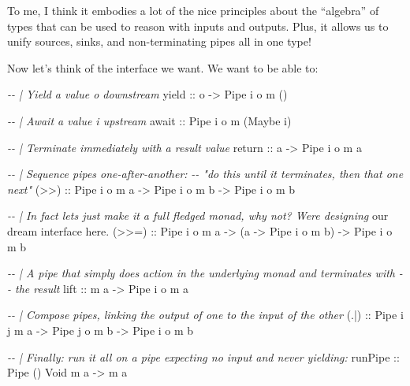 \documentclass[]{article}
\newenvironment{Shaded}{}{}
\newcommand{\CommentTok}[1]{\textcolor[rgb]{0.38,0.63,0.69}{\textit{#1}}}
\newcommand{\DataTypeTok}[1]{\textcolor[rgb]{0.56,0.13,0.00}{#1}}
\newcommand{\FunctionTok}[1]{\textcolor[rgb]{0.02,0.16,0.49}{#1}}
\newcommand{\NormalTok}[1]{#1}
\newcommand{\OperatorTok}[1]{\textcolor[rgb]{0.40,0.40,0.40}{#1}}
\newcommand{\OtherTok}[1]{\textcolor[rgb]{0.00,0.44,0.13}{#1}}
\begin{document}
To me, I think it embodies a lot of the nice principles about the ``algebra'' of
types that can be used to reason with inputs and outputs. Plus, it allows us to
unify sources, sinks, and non-terminating pipes all in one type!

Now let's think of the interface we want. We want to be able to:

\begin{Shaded}
\begin{Highlighting}[]
\CommentTok{{-}{-} | Yield a value \textasciigrave{}o\textasciigrave{} downstream}
\OtherTok{yield ::}\NormalTok{ o }\OtherTok{{-}>} \DataTypeTok{Pipe}\NormalTok{ i o m ()}

\CommentTok{{-}{-} | Await a value \textasciigrave{}i\textasciigrave{} upstream}
\OtherTok{await ::} \DataTypeTok{Pipe}\NormalTok{ i o m (}\DataTypeTok{Maybe}\NormalTok{ i)}

\CommentTok{{-}{-} | Terminate immediately with a result value}
\FunctionTok{return}\OtherTok{ ::}\NormalTok{ a }\OtherTok{{-}>} \DataTypeTok{Pipe}\NormalTok{ i o m a}

\CommentTok{{-}{-} | Sequence pipes one{-}after{-}another:}
\CommentTok{{-}{-} "do this until it terminates, then that one next"}
\OtherTok{(>>) ::} \DataTypeTok{Pipe}\NormalTok{ i o m a }\OtherTok{{-}>} \DataTypeTok{Pipe}\NormalTok{ i o m b }\OtherTok{{-}>} \DataTypeTok{Pipe}\NormalTok{ i o m b}

\CommentTok{{-}{-} | In fact let\textquotesingle{}s just make it a full fledged monad, why not?  We\textquotesingle{}re designing}
\NormalTok{our dream interface here}\OperatorTok{.}
\OtherTok{(>>=) ::} \DataTypeTok{Pipe}\NormalTok{ i o m a }\OtherTok{{-}>}\NormalTok{ (a }\OtherTok{{-}>} \DataTypeTok{Pipe}\NormalTok{ i o m b) }\OtherTok{{-}>} \DataTypeTok{Pipe}\NormalTok{ i o m b}

\CommentTok{{-}{-} | A pipe that simply does action in the underlying monad and terminates with}
\CommentTok{{-}{-} the result}
\OtherTok{lift ::}\NormalTok{ m a }\OtherTok{{-}>} \DataTypeTok{Pipe}\NormalTok{ i o m a}

\CommentTok{{-}{-} | Compose pipes, linking the output of one to the input of the other}
\OtherTok{(.|) ::} \DataTypeTok{Pipe}\NormalTok{ i j m a }\OtherTok{{-}>} \DataTypeTok{Pipe}\NormalTok{ j o m b }\OtherTok{{-}>} \DataTypeTok{Pipe}\NormalTok{ i o m b}

\CommentTok{{-}{-} | Finally: run it all on a pipe expecting no input and never yielding:}
\OtherTok{runPipe ::} \DataTypeTok{Pipe}\NormalTok{ () }\DataTypeTok{Void}\NormalTok{ m a }\OtherTok{{-}>}\NormalTok{ m a}
\end{Highlighting}
\end{Shaded}
\end{document}
